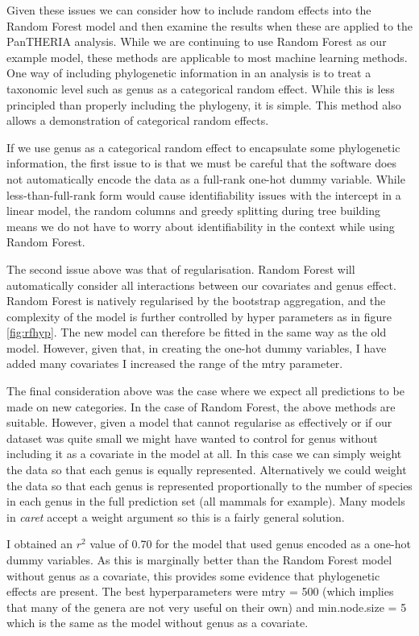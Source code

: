 \documentclass[10pt,]{article}
\begin{document}
Given these issues we can consider how to include random effects into the Random Forest model and then examine the results when these are applied to the PanTHERIA analysis.
While we are continuing to use Random Forest as our example model, these methods are applicable to most machine learning methods.
One way of including phylogenetic information in an analysis is to treat a taxonomic level such as genus as a categorical random effect.
While this is less principled than properly including the phylogeny, it is simple.
This method also allows a demonstration of categorical random effects.

If we use genus as a categorical random effect to encapsulate some phylogenetic information, the first issue to is that we must be careful that the software does not automatically encode the data as a full-rank one-hot dummy variable.
While less-than-full-rank form would cause identifiability issues with the intercept in a linear model, the random columns and greedy splitting during tree building means we do not have to worry about identifiability in the context while using Random Forest.

The second issue above was that of regularisation.
Random Forest will automatically consider all interactions between our covariates and genus effect.
Random Forest is natively regularised by the bootstrap aggregation, and the complexity of the model is further controlled by hyper parameters as in figure \ref{fig:rfhyp}.
The new model can therefore be fitted in the same way as the old model.
However, given that, in creating the one-hot dummy variables, I have added many covariates I increased the range of the mtry parameter.

The final consideration above was the case where we expect all predictions to be made on new categories.
In the case of Random Forest, the above methods are suitable.
However, given a model that cannot regularise as effectively or if our dataset was quite small we might have wanted to control for genus without including it as a covariate in the model at all.
In this case we can simply weight the data so that each genus is equally represented.
Alternatively we could weight the data so that each genus is represented proportionally to the number of species in each genus in the full prediction set (all mammals for example).
Many models in \emph{caret} accept a weight argument so this is a fairly general solution.

I obtained an \(r^2\) value of 0.70 for the model that used genus encoded as a one-hot dummy variables.
As this is marginally better than the Random Forest model without genus as a covariate, this provides some evidence that phylogenetic effects are present.
The best hyperparameters were mtry = 500 (which implies that many of the genera are not very useful on their own) and min.node.size = 5 which is the same as the model without genus as a covariate.
\end{document}
